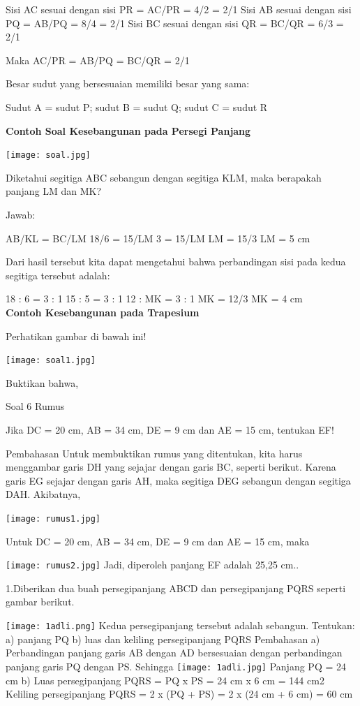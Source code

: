 \documentclass[11pt,fleqn]{book} %
\begin{document}
Sisi AC sesuai dengan sisi PR = AC/PR = 4/2 = 2/1
Sisi AB sesuai dengan sisi PQ = AB/PQ = 8/4 = 2/1
Sisi BC sesuai dengan sisi QR = BC/QR = 6/3 = 2/1

Maka AC/PR = AB/PQ = BC/QR = 2/1


Besar sudut yang bersesuaian memiliki besar yang sama:

Sudut A = sudut P; sudut B = sudut Q; sudut C = sudut R

\textbf{Contoh Soal Kesebangunan pada Persegi Panjang}


\texttt{[image: soal.jpg]}


Diketahui segitiga ABC sebangun dengan segitiga KLM, maka berapakah panjang LM dan MK?

Jawab:

AB/KL = BC/LM
18/6  = 15/LM
   3  = 15/LM
   LM = 15/3
   LM = 5 cm

Dari hasil tersebut kita dapat mengetahui bahwa perbandingan sisi pada kedua segitiga tersebut adalah:

18 : 6 = 3 : 1
15 : 5 = 3 : 1
12 : MK = 3 : 1
MK = 12/3
MK = 4 cm
\\

\textbf{Contoh Kesebangunan pada Trapesium}

Perhatikan gambar di bawah ini!

\texttt{[image: soal1.jpg]}

Buktikan bahwa,

Soal 6 Rumus

Jika DC = 20 cm, AB = 34 cm, DE = 9 cm dan AE = 15 cm, tentukan EF!

Pembahasan Untuk membuktikan rumus yang ditentukan, kita harus menggambar garis DH yang sejajar dengan garis BC, seperti berikut.
Karena garis EG sejajar dengan garis AH, maka segitiga DEG sebangun dengan segitiga DAH. Akibatnya,

\texttt{[image: rumus1.jpg]}

Untuk DC = 20 cm, AB = 34 cm, DE = 9 cm dan AE = 15 cm, maka

\texttt{[image: rumus2.jpg]}
Jadi, diperoleh panjang EF adalah 25,25 cm..

1.Diberikan dua buah persegipanjang ABCD dan persegipanjang PQRS seperti gambar berikut.

\texttt{[image: 1adli.png]}
Kedua persegipanjang tersebut adalah sebangun. Tentukan:
a) panjang PQ
b) luas dan keliling persegipanjang PQRS
Pembahasan
a) Perbandingan panjang garis AB dengan AD bersesuaian dengan perbandingan panjang garis PQ dengan PS. Sehingga
\texttt{[image: 1adli.jpg]}
Panjang PQ = 24 cm
b) Luas persegipanjang PQRS = PQ x PS = 24 cm x 6 cm = 144 cm2
Keliling persegipanjang PQRS = 2 x (PQ + PS) = 2 x (24 cm + 6 cm) = 60 cm
\end{document}
